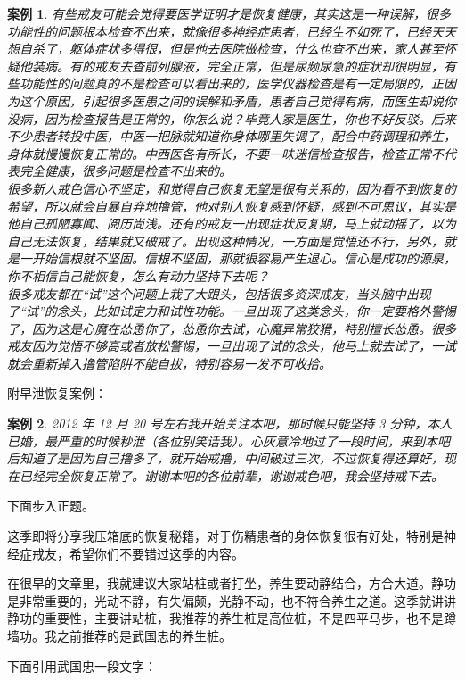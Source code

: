 \documentclass{ctexart}
\newtheorem{case}{案例}
\begin{document}
\begin{case}
    有些戒友可能会觉得要医学证明才是恢复健康，其实这是一种误解，很多功能性的问题根本检查不出来，就像很多神经症患者，已经生不如死了，已经天天想自杀了，躯体症状多得很，但是他去医院做检查，什么也查不出来，家人甚至怀疑他装病。有的戒友去查前列腺液，完全正常，但是尿频尿急的症状却很明显，有些功能性的问题真的不是检查可以看出来的，医学仪器检查是有一定局限的，正因为这个原因，引起很多医患之间的误解和矛盾，患者自己觉得有病，而医生却说你没病，因为检查报告是正常的，你怎么说？毕竟人家是医生，你也不好反驳。后来不少患者转投中医，中医一把脉就知道你身体哪里失调了，配合中药调理和养生，身体就慢慢恢复正常的。中西医各有所长，不要一味迷信检查报告，检查正常不代表完全健康，很多问题是检查不出来的。\\
    很多新人戒色信心不坚定，和觉得自己恢复无望是很有关系的，因为看不到恢复的希望，所以就会自暴自弃地撸管，他对别人恢复感到怀疑，感到不可思议，其实是他自己孤陋寡闻、阅历尚浅。还有的戒友一出现症状反复期，马上就动摇了，以为自己无法恢复，结果就又破戒了。出现这种情况，一方面是觉悟还不行，另外，就是一开始信根就不坚固。信根不坚固，那就很容易产生退心。信心是成功的源泉，你不相信自己能恢复，怎么有动力坚持下去呢？\\
    很多戒友都在“试”这个问题上栽了大跟头，包括很多资深戒友，当头脑中出现了“试”的念头，比如试定力和试性功能。一旦出现了这类念头，你一定要格外警惕了，因为这是心魔在怂恿你了，怂恿你去试，心魔异常狡猾，特别擅长怂恿。很多戒友因为觉悟不够高或者放松警惕，一旦出现了试的念头，他马上就去试了，一试就会重新掉入撸管陷阱不能自拔，特别容易一发不可收拾。
\end{case}

附早泄恢复案例：

\begin{case}
    2012 年 12 月 20 号左右我开始关注本吧，那时候只能坚持 3 分钟，本人已婚，最严重的时候秒泄（各位别笑话我）。心灰意冷地过了一段时间，来到本吧后知道了是因为自己撸多了，就开始戒撸，中间破过三次，不过恢复得还算好，现在已经完全恢复正常了。谢谢本吧的各位前辈，谢谢戒色吧，我会坚持戒下去。
\end{case}

下面步入正题。

这季即将分享我压箱底的恢复秘籍，对于伤精患者的身体恢复很有好处，特别是神经症戒友，希望你们不要错过这季的内容。

在很早的文章里，我就建议大家站桩或者打坐，养生要动静结合，方合大道。静功是非常重要的，光动不静，有失偏颇，光静不动，也不符合养生之道。这季就讲讲静功的重要性，主要讲站桩，我推荐的养生桩是高位桩，不是四平马步，也不是蹲墙功。我之前推荐的是武国忠的养生桩。

下面引用武国忠一段文字：
\end{document}
